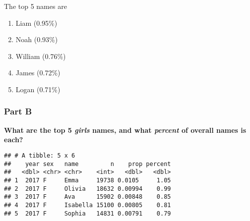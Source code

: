 \documentclass[
]{article}
\newenvironment{Shaded}{\begin{snugshade}}{\end{snugshade}}
\newcommand{\CommentTok}[1]{\textcolor[rgb]{0.56,0.35,0.01}{\textit{#1}}}
\newcommand{\DataTypeTok}[1]{\textcolor[rgb]{0.13,0.29,0.53}{#1}}
\newcommand{\DecValTok}[1]{\textcolor[rgb]{0.00,0.00,0.81}{#1}}
\newcommand{\KeywordTok}[1]{\textcolor[rgb]{0.13,0.29,0.53}{\textbf{#1}}}
\newcommand{\NormalTok}[1]{#1}
\newcommand{\OperatorTok}[1]{\textcolor[rgb]{0.81,0.36,0.00}{\textbf{#1}}}
\newcommand{\StringTok}[1]{\textcolor[rgb]{0.31,0.60,0.02}{#1}}
\providecommand{\tightlist}{%
  \setlength{\itemsep}{0pt}\setlength{\parskip}{0pt}}
\begin{document}
The top 5 names are

\begin{enumerate}
\def\labelenumi{\arabic{enumi}.}
\tightlist
\item
  Liam (0.95\%)
\item
  Noah (0.93\%)
\item
  William (0.76\%)
\item
  James (0.72\%)
\item
  Logan (0.71\%)
\end{enumerate}

\hypertarget{part-b}{%
\subsubsection{Part B}\label{part-b}}

\textbf{What are the top 5 \emph{girls} names, and what \emph{percent}
of overall names is each?}

\begin{Shaded}
\end{Shaded}

\begin{verbatim}
## # A tibble: 5 x 6
##    year sex   name         n    prop percent
##   <dbl> <chr> <chr>    <int>   <dbl>   <dbl>
## 1  2017 F     Emma     19738 0.0105     1.05
## 2  2017 F     Olivia   18632 0.00994    0.99
## 3  2017 F     Ava      15902 0.00848    0.85
## 4  2017 F     Isabella 15100 0.00805    0.81
## 5  2017 F     Sophia   14831 0.00791    0.79
\end{verbatim}
\end{document}
